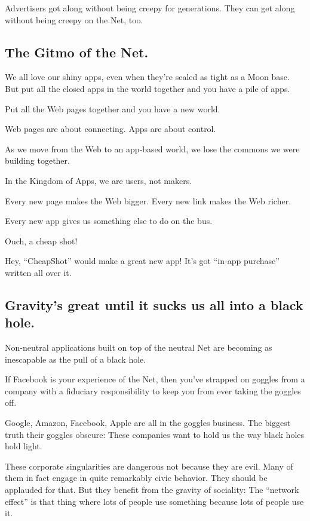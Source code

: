 \documentclass[letterpaper,12pt,english]{sphinxmanual}
\begin{document}
Advertisers got along without being creepy for generations. They can get along without being creepy on the Net, too.


\subsection{The Gitmo of the Net.}
\label{2015newclues:the-gitmo-of-the-net}
We all love our shiny apps, even when they're sealed as tight as a Moon base. But put all the closed apps in the world together and you have a pile of apps.

Put all the Web pages together and you have a new world.

Web pages are about connecting. Apps are about control.

As we move from the Web to an app-based world, we lose the commons we were building together.

In the Kingdom of Apps, we are users, not makers.

Every new page makes the Web bigger. Every new link makes the Web richer.

Every new app gives us something else to do on the bus.

Ouch, a cheap shot!

Hey, ``CheapShot'' would make a great new app! It's got ``in-app purchase'' written all over it.


\subsection{Gravity's great until it sucks us all into a black hole.}
\label{2015newclues:gravity-s-great-until-it-sucks-us-all-into-a-black-hole}
Non-neutral applications built on top of the neutral Net are becoming as inescapable as the pull of a black hole.

If Facebook is your experience of the Net, then you've strapped on goggles from a company with a fiduciary responsibility to keep you from ever taking the goggles off.

Google, Amazon, Facebook, Apple are all in the goggles business.  The biggest truth their goggles obscure: These companies want to hold us the way black holes hold light.

These corporate singularities are dangerous not because they are evil. Many of them in fact engage in quite remarkably civic behavior. They should be applauded for that.
But they benefit from the gravity of sociality: The ``network effect'' is that thing where lots of people use something because lots of people use it.
\end{document}
